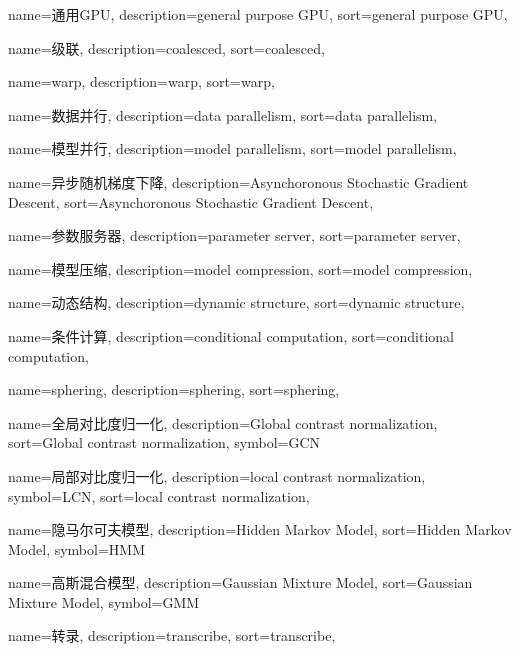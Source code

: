 {
  name=通用GPU,
  description={general purpose GPU},
  sort={general purpose GPU},
}

{
  name=级联,
  description={coalesced},
  sort={coalesced},
}

{
  name=warp,
  description={warp},
  sort={warp},
}

{
  name=数据并行,
  description={data parallelism},
  sort={data parallelism},
}

{
  name=模型并行,
  description={model parallelism},
  sort={model parallelism},
}

{
  name=异步随机梯度下降,
  description={Asynchoronous Stochastic Gradient Descent},
  sort={Asynchoronous Stochastic Gradient Descent},
}

{
  name=参数服务器,
  description={parameter server},
  sort={parameter server},
}

{
  name=模型压缩,
  description={model compression},
  sort={model compression},
}

{
  name=动态结构,
  description={dynamic structure},
  sort={dynamic structure},
}

{
  name=条件计算,
  description={conditional computation},
  sort={conditional computation},
}

{
  name=sphering,
  description={sphering},
  sort={sphering},
}

{
  name=全局对比度归一化,
  description={Global contrast normalization},
  sort={Global contrast normalization},
  symbol={GCN}
}

{
  name=局部对比度归一化,
  description={local contrast normalization},
  symbol={LCN},
  sort={local contrast normalization},
}

{
  name=隐马尔可夫模型,
  description={Hidden Markov Model},
  sort={Hidden Markov Model},
  symbol={HMM}
}

{
  name=高斯混合模型,
  description={Gaussian Mixture Model},
  sort={Gaussian Mixture Model},
  symbol={GMM}
}

{
  name=转录,
  description={transcribe},
  sort={transcribe},
}

